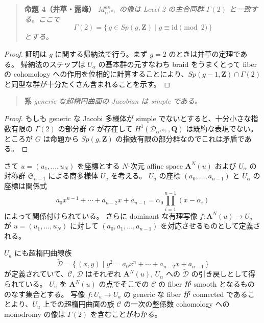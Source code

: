 \documentclass[uplatex,dvipdfmx]{jlreq}
\begin{document}
\begin{quote}
\textbf{命題 4（井草・露峰）}\quad
\textit{$M_{\alpha^{(0)}}^{an}$ の像は Level 2 の主合同群 $\Gamma(2)$ と一致する。ここで
\[
  \Gamma(2) = \{\, g \in Sp(g, \mathbf{Z}) \mid g \equiv \mathrm{id} \pmod{2} \,\}
\]
とする。}
\end{quote}

\begin{proof}
証明は $g$ に関する帰納法で行う。まず $g = 2$ のときは井草の定理である。
帰納法のステップは $U_{\alpha}$ の基本群の元すなわち braid をうまくとって fiber の cohomology への作用を位相的に計算することにより、$Sp(g-1, \mathbf{Z}) \cap \Gamma(2)$ と同型な群が十分たくさん含まれることを示す。
\end{proof}

\begin{quote}
\textbf{系}\quad
\textit{generic な超楕円曲面の Jacobian は simple である。}
\end{quote}

\begin{proof}
もしも generic な Jacobi 多様体が simple でないとすると、十分小さな指数有限の $\Gamma(2)$ の部分群 $G$ が存在して $H^1(\mathcal{D}_{\alpha^{(0)}}, \mathbf{Q})$ は既約な表現でない。
ところが $G$ は命題から $Sp(g, \mathbf{Z})$ の指数有限の部分群なのでこれは矛盾である。
\end{proof}

さて $u = (u_1, \dots, u_N)$ を座標とする $N$-次元 affine space $\mathbf{A}^N(u)$ および $U_{\alpha}$ の対称群 $\mathfrak{S}_{n-1}$ による商多様体 $U_a$ を考える。
$U_a$ の座標 $(a_0, \dots, a_{n-1})$ と $U_{\alpha}$ の座標は関係式
\[
  a_0 x^{n-1} + \cdots + a_{n-2} x + a_{n-1} = \alpha_0 \prod_{i=1}^{n-1}(x - \alpha_i)
\]
によって関係付けられている。
さらに dominant な有理写像 $f : \mathbf{A}^N(u) \to U_a$ が $u = (u_1, \dots, u_N)$ に対して $(a_0, a_1, \dots, a_{n-1})$ を対応させるものとして定義される。

$U_a$ にも超楕円曲線族
\[
  \tilde{\mathcal{D}} = \{\, (x, y) \mid y^2 = a_0 x^n + \cdots + a_{n-2} x + a_{n-1} \,\}
\]
が定義されていて、$\mathcal{C}$, $\mathcal{D}$ はそれぞれ $\mathbf{A}^N(u)$, $U_{\alpha}$ への $\tilde{\mathcal{D}}$ の引き戻しとして得られている。
$U_u$ を $\mathbf{A}^N(u)$ の点でそこでの $\mathcal{C}$ の fiber が smooth となるもののなす集合とする。
写像 $f : U_u \to U_a$ の generic な fiber が connected であることより、$U_u$ 上での超楕円曲面の族 $\mathcal{C}$ の一次の整係数 cohomology への monodromy の像は $\Gamma(2)$ を含むことがわかる。
\end{document}
